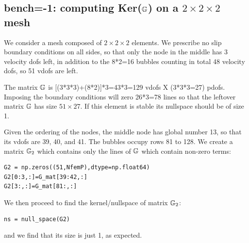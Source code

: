 \subsection*{bench=-1: computing Ker(${\mathbb{G}}$) on a $2\times 2 \times 2$ mesh}

We consider a mesh composed of $2\times 2\times 2$ elements. We prescribe no slip boundary conditions 
on all sides, so that only the node in the middle has 3 velocity dofs left, in addition 
to the 8*2=16 bubbles counting in total 48 velocity dofs, so 51 vdofs are left.

The matrix ${\mathbb{G}}$ is [(3*3*3)+(8*2)]*3=43*3=129 vdofs X (3*3*3=27) pdofs. 
Imposing the boundary conditions will zero 26*3=78 lines so that the leftover matrix ${\mathbb{G}}$
has size $51\times 27$. If this element is stable its nullspace should be of size 1. 

Given the ordering of the nodes, the middle node has global number 13, so that 
its vdofs are 39, 40, and 41. The bubbles occupy rows 81 to 128. 
We create a matrix ${\mathbb{G}}_2$ which contains only the lines of ${\mathbb{G}}$ which contain non-zero terms:
\begin{lstlisting}
G2 = np.zeros((51,NfemP),dtype=np.float64)
G2[0:3,:]=G_mat[39:42,:] 
G2[3:,:]=G_mat[81:,:]    
\end{lstlisting}
We then proceed to find the kernel/nullspace of matrix ${\mathbb{G}}_2$:
\begin{lstlisting}
ns = null_space(G2)
\end{lstlisting}
and we find that its size is just 1, as expected. 


